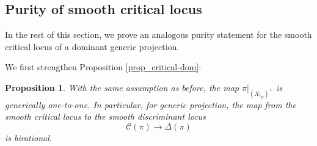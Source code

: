 \documentclass[12pt]{amsart}
\newtheorem{proposition}[theorem]{Proposition}
\newtheorem{claim}[theorem]{Claim}
\begin{document}









\subsection{Purity of smooth critical locus}
In the rest of this section, we prove an analogous purity statement for the smooth critical locus of a dominant generic projection. 

We first strengthen Proposition \ref{prop_critical-dom}:


\begin{proposition}\label{prop_one-to-one}
 With the same assumption as before, the map  $\pi|_{(X|_V)^{\perp}}$ is generically one-to-one. In particular, for generic projection, the map from the smooth critical locus to the smooth discriminant locus
 $$\mathcal {C}(\pi)\to \Delta(\pi)$$
 is birational.
\end{proposition}
\end{document}
